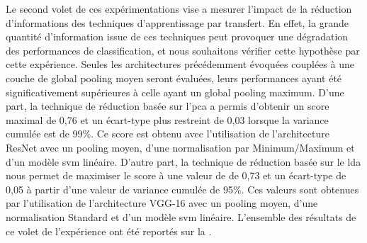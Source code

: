 Le second volet de ces expérimentations vise a mesurer l'impact de la réduction d'informations des techniques d'apprentissage par transfert. En effet, la grande quantité d'information issue de ces techniques peut provoquer une dégradation des performances de classification, et nous souhaitons vérifier cette hypothèse par cette expérience. Seules les architectures précédemment évoquées couplées à une couche de global pooling moyen seront évaluées, leurs performances ayant été significativement supérieures à celle ayant un global pooling maximum. D'une part, la technique de réduction basée sur l'\gls{pca} a permis d'obtenir un score maximal de 0,76 et un écart-type plus restreint de 0,03 lorsque la variance cumulée est de 99\%. Ce score est obtenu avec l'utilisation de l'architecture ResNet avec un pooling moyen, d'une normalisation par Minimum/Maximum et d'un modèle \gls{svm} linéaire. D'autre part, la technique de réduction basée sur le \gls{lda} nous permet de maximiser le score à une valeur de de 0,73 et un écart-type de 0,05 à partir d'une valeur de variance cumulée de 95\%. Ces valeurs sont obtenues  par l'utilisation de l'architecture VGG-16 avec un pooling moyen, d'une normalisation Standard et d'un modèle \gls{svm} linéaire. L'ensemble des résultats de ce volet de l'expérience ont été reportés sur la .\par

